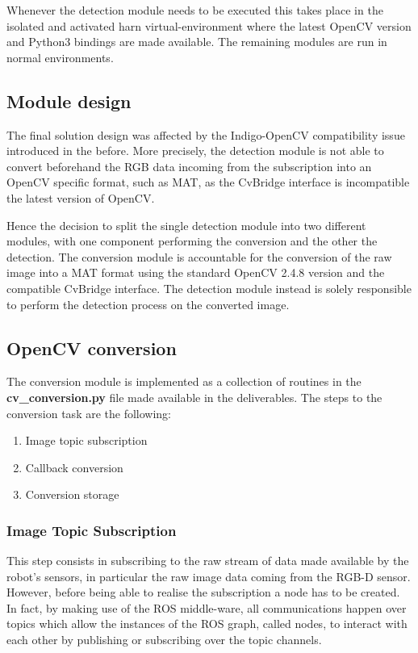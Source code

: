 Whenever the detection module needs to be executed this takes place in the isolated and activated harn virtual-environment where the latest OpenCV version and Python3 bindings are made available. The remaining modules are run in normal environments.

\clearpage

\subsection{Module design}

The final solution design was affected by the Indigo-OpenCV compatibility issue introduced in the before. More precisely, the detection module is not able to convert beforehand the RGB data incoming from the subscription into an OpenCV specific format, such as MAT, as the CvBridge interface is incompatible the latest version of OpenCV.

Hence the decision to split the single detection module into two different modules, with one component performing the conversion and the other the detection. The conversion module is accountable for the conversion of the raw image into a MAT format using the standard OpenCV 2.4.8 version and the compatible CvBridge interface. The detection module instead is solely responsible to perform the detection process on the converted image.

\subsection{OpenCV conversion}

The conversion module is implemented as a collection of routines in the \textbf{cv\_conversion.py} file made available in the deliverables. The steps to the conversion task are the following:

\begin{enumerate}
  \item Image topic subscription
  \item Callback conversion
  \item Conversion storage
\end{enumerate}

\subsubsection{Image Topic Subscription}

This step consists in subscribing to the raw stream of data made available by the robot's sensors, in particular the raw image data coming from the RGB-D sensor. However, before being able to realise the subscription a node has to be created. In fact, by making use of the ROS middle-ware, all communications happen over topics which allow the instances of the ROS graph, called nodes, to interact with each other by publishing or subscribing over the topic channels. 

